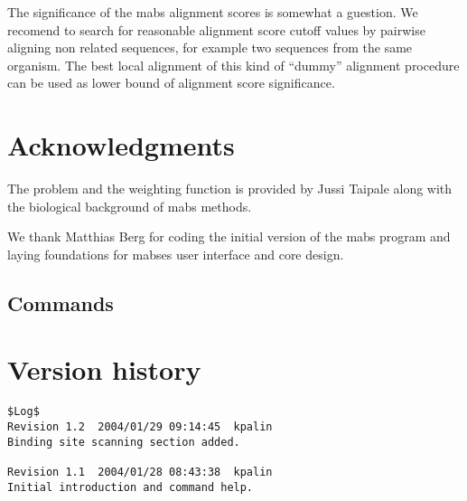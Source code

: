 The significance of the mabs alignment scores is somewhat a
guestion. We recomend to search for reasonable alignment score cutoff
values by pairwise aligning non related sequences, for example two
sequences from the same organism. The best local alignment of this
kind of ``dummy'' alignment procedure can be used as lower bound of
alignment score significance.

\section{Acknowledgments}
\label{sec:acknow}

The problem and the weighting function is provided by Jussi Taipale
along with the biological background of mabs methods.

We thank Matthias Berg for coding the initial version of the mabs
program and laying foundations for mabses user interface and core
design.





\appendix

\begin{landscape}
\section{Commands}
\label{sec:mabscommands}
\begin{small}
%
\end{small}
\end{landscape}


\section{Version history}
\begin{verbatim}
$Log$
Revision 1.2  2004/01/29 09:14:45  kpalin
Binding site scanning section added.

Revision 1.1  2004/01/28 08:43:38  kpalin
Initial introduction and command help.

\end{verbatim}

